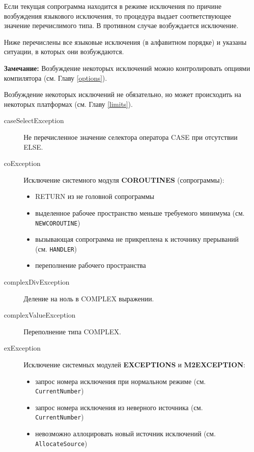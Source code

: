 Если текущая сопрограмма находится в режиме исключения по 
причине возбуждения языкового исключения,
то процедура выдает соответствующее значение перечислимого типа. 
В противном случае возбуждается исключение.

Ниже перечислены все языковые исключения (в алфавитном порядке)
и указаны ситуации, в которых они возбуждаются.

{\bf Замечание:} Возбуждение некоторых исключений можно
контролировать опциями компилятора (см. Главу \ref{options}).

Возбуждение некоторых исключений не обязательно, но 
может происходить на некоторых платформах
(см. Главу \ref{limits}).

\begin{description}
\item[caseSelectException] \mbox{}

Не перечисленное значение селектора оператора CASE
при отсутствии ELSE.

\item[coException] \mbox{}

Исключение системного модуля
{\bf COROUTINES} (сопрограммы):
        \begin{itemize}
        \item RETURN из не головной сопрограммы
        \item выделенное рабочее пространство меньше требуемого минимума
(см. {\tt NEWCOROUTINE})
        \item вызывающая сопрограмма не прикреплена к источнику прерываний
(см. {\tt HANDLER})
        \item переполнение рабочего пространства
        \end{itemize}

\item[complexDivException] \mbox{}

Деление на ноль в COMPLEX выражении.

\item[complexValueException] \mbox{}

Переполнение типа COMPLEX.

\item[exException] \mbox{}

Исключение системных модулей {\bf EXCEPTIONS} и {\bf M2EXCEPTION}:
        \begin{itemize}
        \item запрос номера исключения при нормальном режиме
              (см. {\tt CurrentNumber})
        \item запрос номера исключения из неверного источника
              (см. {\tt CurrentNumber})
        \item невозможно аллоцировать новый источник исключений
              (см. {\tt AllocateSource})


\end{itemize}
\end{description}
